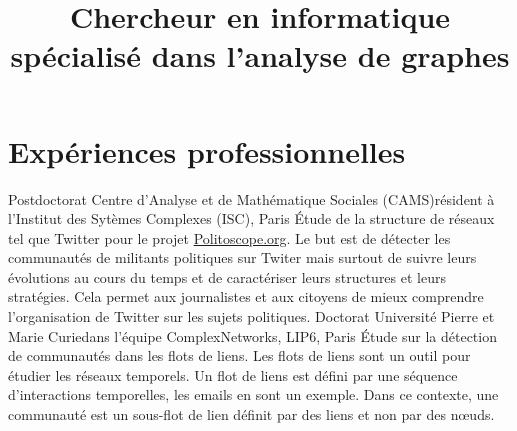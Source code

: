 \documentclass[11pt,a4paper]{moderncv}
\title{Chercheur en informatique spécialisé dans l'analyse de graphes}
\begin{document}
\maketitle
\vspace{-1.2cm}

\section{Expériences professionnelles}
 {Postdoctorat} {Centre d’Analyse et de Mathématique Sociales (CAMS)}{}{résident à l'Institut des Sytèmes Complexes (ISC), Paris}
{
	Étude de la structure de réseaux tel que Twitter pour le projet \url{Politoscope.org}. Le but est de détecter les communautés de militants politiques sur Twiter mais surtout de suivre leurs évolutions au cours du temps et de caractériser leurs structures et leurs stratégies. Cela permet aux journalistes et aux citoyens de mieux comprendre l'organisation de Twitter sur les sujets politiques.
}
\vspace*{0.2cm}
 {Doctorat} {Université Pierre et Marie Curie}{}{dans l'équipe ComplexNetworks, LIP6, Paris}
{
 Étude sur la détection de communautés dans les flots de liens. Les flots de liens sont un outil pour étudier les réseaux temporels.
 Un flot de liens est défini par une séquence d'interactions temporelles, les emails en sont un exemple. Dans ce contexte, une communauté est un sous-flot de lien définit par des liens et non par des n\oe uds.
}
\vspace*{0.2cm}
%
\vspace*{0.2cm}

\end{document}
